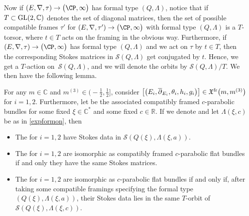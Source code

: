 Now if $(E,\nabla,
\tau)\to \bigl(\CP,\infty\bigr)$ has formal type $(Q,\Lambda)$, notice that if $T\subset {\rm GL}(2,\mathbb{C})$ denotes the set of diagonal matrices, then the set of possible compatible frames $\tau'$ for $(E,\nabla,\tau')\to \bigl(\CP,\infty\bigr)$ with formal type $(Q,\Lambda)$ is a $T$-torsor, where $t\in T$ acts on the framing in the obvious way. Furthermore, if $(E,\nabla,\tau)\to \bigl(\CP,\infty\bigr)$ has formal type $(Q,\Lambda)$ and we act on $\tau$ by $t\in T$, then the corresponding Stokes matrices in $\mathcal{S}(Q,\Lambda)$ get conjugated by $t$. Hence, we get a $T$-action on~${\mathcal{S}(Q,\Lambda)}$, and we will denote the orbits by $\mathcal{S}(Q,\Lambda)/T$. We then have the following lemma.

\begin{Lemma} \label{secondlemma} For any $m\in \mathbb{C}$ and $m^{(3)}\in \bigl(-\frac12,\frac12\bigr]$, consider $\smash{\bigl[\bigl(E_i,\overline{\partial}_{E_i},\theta_i,h_i,g_i\bigr)\bigr]}\in \mathfrak{X}^{\textnormal{fr}}\bigl(m,\allowbreak\smash{ m^{(3)}}\bigr)$ for $i=1,2$. Furthermore, let  be the associated compatibly framed $c$-parabolic bundles for some fixed $\xi \in \mathbb{C}^*$ and some fixed $c\in \mathbb{R}$. If we denote  and let $\Lambda(\xi,c)$ be as in \eqref{expformon}, then
\begin{itemize}\itemsep=0pt
 \item The  for $i=1,2$ have Stokes data in $\mathcal{S}(Q(\xi),\Lambda(\xi,a))$.
 \item The  for $i=1,2$ are isomorphic as compatibly framed $c$-parabolic flat bundles if and only they have the same Stokes matrices.
 \item The  for $i=1,2$ are isomorphic as $c$-parabolic flat bundles if and only if, after taking some compatible framings specifying the formal type $(Q(\xi),\Lambda(\xi,a))$, their Stokes data lies in the same $T$-orbit of $\mathcal{S}(Q(\xi),\Lambda(\xi,c))$.
\end{itemize}
\end{Lemma}

